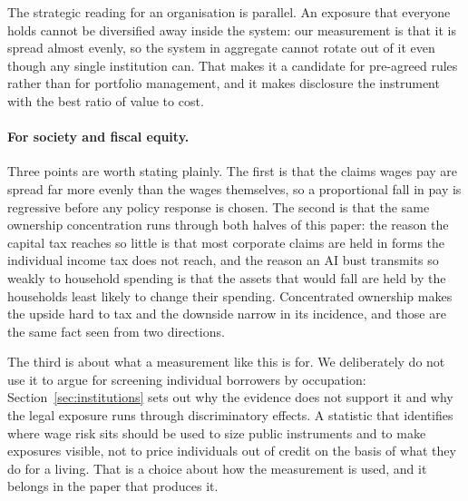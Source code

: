 The strategic reading for an organisation is parallel. An exposure that everyone holds cannot be
diversified away inside the system: our measurement is that it is spread almost evenly, so the
system in aggregate cannot rotate out of it even though any single institution can. That makes it
a candidate for pre-agreed rules rather than for portfolio management, and it makes disclosure the
instrument with the best ratio of value to cost.

\paragraph{For society and fiscal equity.} Three points are worth stating plainly. The first is
that the claims wages pay are spread far more evenly than the wages themselves, so a proportional
fall in pay is regressive before any policy response is chosen. The second is that the same
ownership concentration runs through both halves of this paper: the reason the capital tax reaches
so little is that most corporate claims are held in forms the individual income tax does not
reach, and the reason an AI bust transmits so weakly to household spending is that the assets that
would fall are held by the households least likely to change their spending. Concentrated
ownership makes the upside hard to tax and the downside narrow in its incidence, and those are the
same fact seen from two directions.

The third is about what a measurement like this is for. We deliberately do not use it to argue for
screening individual borrowers by occupation: Section~\ref{sec:institutions} sets out why the
evidence does not support it and why the legal exposure runs through discriminatory effects. A
statistic that identifies where wage risk sits should be used to size public instruments and to
make exposures visible, not to price individuals out of credit on the basis of what they do for a
living. That is a choice about how the measurement is used, and it belongs in the paper that
produces it.
